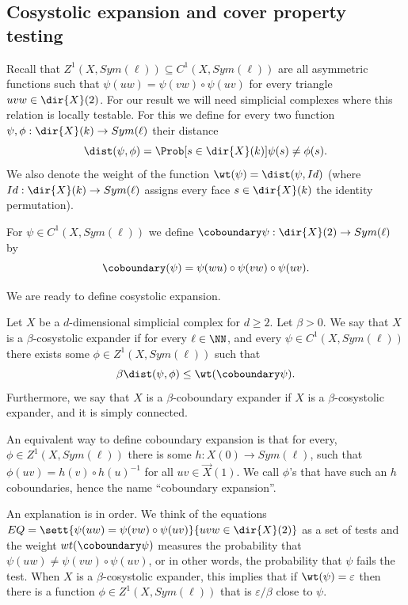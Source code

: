 \subsection{Cosystolic expansion and cover property testing}
Recall that \(Z^1(X,Sym(\ell)) \subseteq C^1(X,Sym(\ell))\) are all asymmetric functions such that \(\psi(uw)=\psi(vw)\circ \psi(uv)\) for every triangle \(uvw \in \dir{X}(2)\). For our result we will need simplicial complexes where this relation is locally testable. For this we define for every two function \(\psi,\phi: \dir{X}(k) \to Sym(\ell)\) their distance
\begin{equation} \label{eq:def-of-dist}
    \dist(\psi,\phi) = \Prob[s \in \dir{X}(k)]{\psi(s) \ne \phi(s)}.
\end{equation}
We also denote the weight of the function \(\wt(\psi) = \dist(\psi,Id)\) (where \(Id:\dir{X}(k) \to Sym(\ell)\) assigns every face \(s \in \dir{X}(k)\) the identity permutation).

For \(\psi \in C^1(X,Sym(\ell))\) we define \(\coboundary \psi: \dir{X}(2) \to Sym(\ell)\) by
\begin{equation} \label{eq:def-of-coboundary}
    \coboundary(\psi) = \psi(wu)\circ \psi(vw) \circ \psi(uv).
\end{equation}

We are ready to define cosystolic expansion.
\begin{definition} \label{def:def-of-cosyst-exp}
    Let \(X\) be a \(d\)-dimensional simplicial complex for \(d \geq 2\). Let \(\beta >0\). We say that \(X\) is a \(\beta\)-cosystolic expander if for every \(\ell \in \NN\), and every \(\psi \in C^1(X,Sym(\ell))\) there exists some \(\phi \in Z^1(X,Sym(\ell))\) such that
    \begin{equation} \label{eq:def-of-cosyst-exp}
        \beta \dist(\psi,\phi) \leq \wt(\coboundary \psi).
    \end{equation}
    Furthermore, we say that \(X\) is a \(\beta\)-coboundary expander if \(X\) is a \(\beta\)-cosystolic expander, and it is simply connected.
\end{definition}
An equivalent way to define coboundary expansion is that for every, $\phi\in Z^1(X,Sym(\ell))$ there is some $h:X(0)\to Sym(\ell)$, such that $\phi(uv) = h(v)\circ h(u)^{-1}$ for all $uv\in \vec X(1)$. We call \(\phi\)'s that have such an \(h\) coboundaries, hence the name ``coboundary expansion''.

An explanation is in order. We think of the equations \(EQ= \sett{\psi(uw)=\psi(vw)\circ \psi(uv)}{uvw \in \dir{X}(2)}\) as a set of tests and the weight \(wt(\coboundary \psi)\) measures the probability that \(\psi(uw)\ne \psi(vw)\circ \psi(uv)\), or in other words, the probability that \(\psi\) fails the test. When \(X\) is a \(\beta\)-cosystolic expander, this implies that if \(\wt(\psi) = \varepsilon\) then there is a function \(\phi \in Z^1(X,Sym(\ell))\) that is \(\varepsilon/\beta\) close to \(\psi\).

